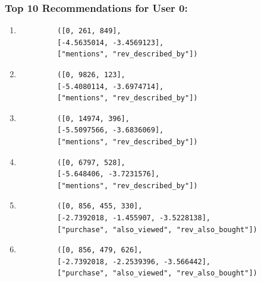 \subsubsection*{Top 10 Recommendations for User 0:}
\begin{enumerate}
    \item \begin{center}
	{\footnotesize
	\begin{verbatim}
		 ([0, 261, 849],
		 [-4.5635014, -3.4569123],
		 ["mentions", "rev_described_by"])
	\end{verbatim}
	}
	\end{center}

    \item \begin{center}
	{\footnotesize
	\begin{verbatim}
		 ([0, 9826, 123],
		 [-5.4080114, -3.6974714],
		 ["mentions", "rev_described_by"])
	\end{verbatim}
	}
	\end{center}

    \item \begin{center}
	{\footnotesize
	\begin{verbatim}
		 ([0, 14974, 396],
		 [-5.5097566, -3.6836069],
		 ["mentions", "rev_described_by"])
	\end{verbatim}
	}
	\end{center}

    \item \begin{center}
	{\footnotesize
	\begin{verbatim}
		 ([0, 6797, 528],
		 [-5.648406, -3.7231576],
		 ["mentions", "rev_described_by"])
	\end{verbatim}
	}
	\end{center}

    \item \begin{center}
	{\footnotesize
	\begin{verbatim}
		 ([0, 856, 455, 330],
		 [-2.7392018, -1.455907, -3.5228138],
		 ["purchase", "also_viewed", "rev_also_bought"])
	\end{verbatim}
	}
	\end{center}

    \item \begin{center}
	{\footnotesize
	\begin{verbatim}
		 ([0, 856, 479, 626],
		 [-2.7392018, -2.2539396, -3.566442],
		 ["purchase", "also_viewed", "rev_also_bought"])
	\end{verbatim}
	}
	\end{center}


\end{enumerate}
